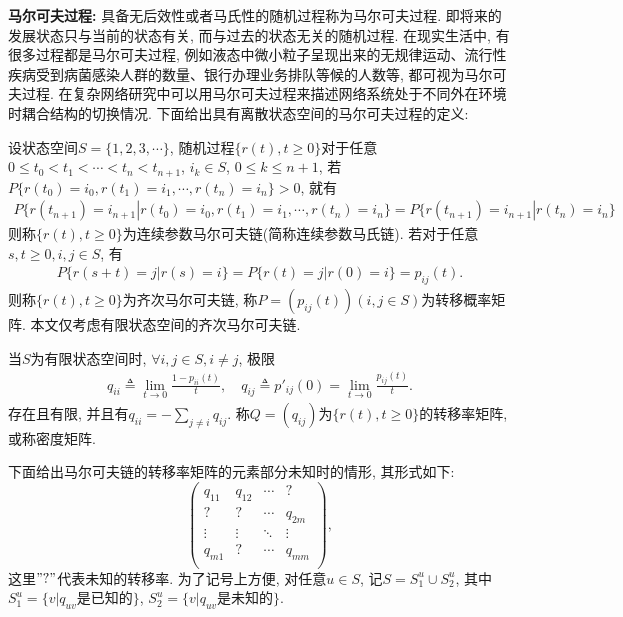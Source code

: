     {\bf 马尔可夫过程:} 具备无后效性或者马氏性的随机过程称为马尔可夫过程. 即将来的发展状态只与当前的状态有关, 而与过去的状态无关的随机过程. 在现实生活中, 有很多过程都是马尔可夫过程, 例如液态中微小粒子呈现出来的无规律运动、流行性疾病受到病菌感染人群的数量、银行办理业务排队等候的人数等, 都可视为马尔可夫过程. 在复杂网络研究中可以用马尔可夫过程来描述网络系统处于不同外在环境时耦合结构的切换情况. 下面给出具有离散状态空间的马尔可夫过程的定义:
    \begin{defn}
           设状态空间$S=\{1,2,3,\cdots\}$, 随机过程$\{r(t), t\geq0\}$对于任意$0\leq t_0<t_1<\cdots<t_n<t_{n+1}$, $i_k\in S$, $0\leq k\leq n+1$, 若$P\{r(t_0)=i_0,r(t_1)=i_1,\cdots,r(t_n)=i_n\}>0$, 就有
           \begin{align*}
                P\{r(t_{n+1})=i_{n+1}|r(t_0)=i_0,r(t_1)=i_1,\cdots,r(t_n)=i_n\}=P\{r(t_{n+1})=i_{n+1}|r(t_n)=i_n\}
            \end{align*}
            则称$\{r(t), t\geq0\}$为连续参数马尔可夫链(简称连续参数马氏链). 若对于任意$s,t\geq0,i,j\in S$, 有
            \begin{align*}
                P\{r(s+t)=j|r(s)=i\}=P\{r(t)=j|r(0)=i\}=p_{ij}(t).
            \end{align*}
            则称$\{r(t), t\geq0\}$为齐次马尔可夫链, 称$P=(p_{ij}(t))(i,j\in S)$为转移概率矩阵. 本文仅考虑有限状态空间的齐次马尔可夫链.
    \end{defn}
    \begin{lem}{\rm{}}
            当$S$为有限状态空间时, $\forall i, j\in S, i\neq j$, 极限
            \begin{align*}
                q_{ii}\triangleq\lim_{t\rightarrow0}\frac{1-p_{ii}(t)}{t},\quad q_{ij}\triangleq p'_{ij}(0)=\lim_{t\rightarrow0}\frac{p_{ij}(t)}{t}.
            \end{align*}
            存在且有限, 并且有$q_{ii}=-\sum_{j\neq i}q_{ij}$. 称$Q=(q_{ij})$为$\{r(t), t\geq0\}$的转移率矩阵, 或称密度矩阵.
    \end{lem}

    下面给出马尔可夫链的转移率矩阵的元素部分未知时的情形, 其形式如下:
        $$
        \left(
                \begin{array}{ccccc}
                q_{11} &q_{12} &\cdots &? \\
                ? &? &\cdots &q_{2m} \\
                \vdots &\vdots &\ddots &\vdots \\
                q_{m1} &? &\cdots &q_{mm} \\
                \end{array}
            \right),
        $$
        这里$"?"$代表未知的转移率. 为了记号上方便, 对任意$u\in S$, 记$S=S^u_1\cup S^u_2$, 其中$S^u_1=\{v| q_{uv} \text{是已知的}\}$, $S^u_2=\{v| q_{uv} \text{是未知的}\}$.

